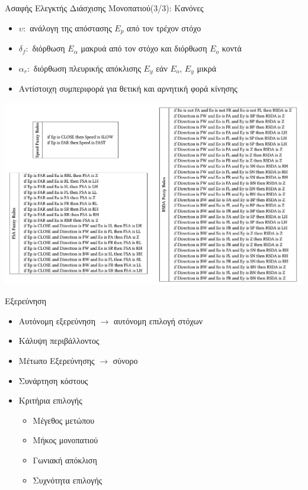 \documentclass[10pt, compress, handout]{beamer} %
\begin{document}
\begin{frame}{Ασαφής Ελεγκτής Διάσχισης Μονοπατιού(3/3): Κανόνες}
	\begin{itemize}
		\item $\upsilon:$ ανάλογη της απόστασης $E_p$ από τον τρέχον στόχο
		\item $\delta_f:$ διόρθωση $E_\alpha$ μακρυά από τον στόχο και διόρθωση $E_o$ κοντά
		\item $\alpha_r:$ διόρθωση πλευρικής απόκλισης $E_y$ εάν $E_o$, $E_y$ μικρά
		\item Αντίστοιχη συμπεριφορά για θετική και αρνητική φορά κίνησης
	\end{itemize}
	\vspace{-0.3cm}
	\includegraphics[width=0.9\linewidth]{Figures/fuzzy_rules.png}	
\end{frame}

\begin{frame}{Εξερεύνηση}
	\begin{itemize}
		\item Αυτόνομη εξερεύνηση $\rightarrow$ αυτόνομη επιλογή στόχων
		\item Κάλυψη περιβάλλοντος
		\item Μέτωπο Εξερεύνησης $\rightarrow$ σύνορο
		\item Συνάρτηση κόστους
		\item Κριτήρια επιλογής
		\begin{itemize}
			\item Μέγεθος μετώπου
			\item Μήκος μονοπατιού
			\item Γωνιακή απόκλιση
			\item Συχνότητα επιλογής
		\end{itemize}			
	\end{itemize}
\end{frame}
\end{document}
